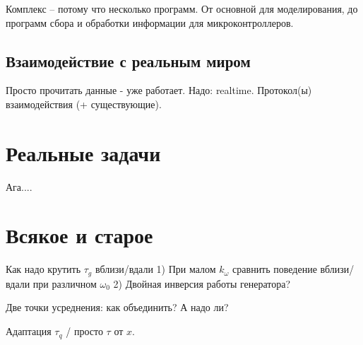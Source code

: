 \documentclass[a4paper,12pt]{article}
\begin{document}
Комплекс -- потому что несколько программ.
От основной для моделирования, до программ сбора и обработки
информации для микроконтроллеров.

\subsection{Взаимодействие с реальным миром}

Просто прочитать данные - уже работает.
Надо: realtime.
Протокол(ы) взаимодействия (+ существующие).


\section{Реальные задачи}

Ага....


\section{Всякое и старое}



Как надо крутить $\tau_g$ вблизи/вдали
 1) При малом $k_\omega$ сравнить поведение вблизи/вдали при различном $\omega_0$
 2) Двойная инверсия работы генератора?

Две точки усреднения: как объединить? А надо ли?

Адаптация $\tau_q$ / просто $\tau$ от $x$.
\end{document}
